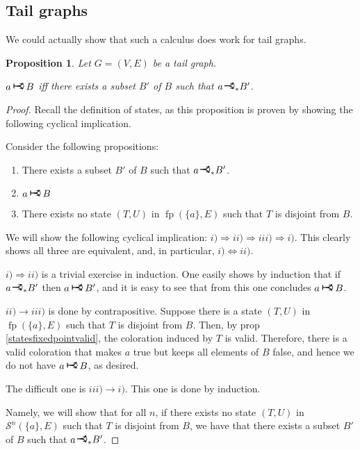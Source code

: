 \documentclass[11pt]{article}
\newcommand{\cS}{\mathcal{S}}
\DeclareMathOperator{\fp}{fp}
\newcommand{\rightcurveor}{
\!
\mathrel{
  \begin{tikzpicture}[scale=0.8]
    \draw[thick,->] (0,0) arc (90:150:-2ex);
    \draw[thick,->] (0,0) arc (90:30:2ex);
    \draw[thick] (-1ex, 0) -- (0.1ex,0);
  \end{tikzpicture}
}\!
}
\newcommand{\Rightcurveor}{
\mathrel{
  \begin{tikzpicture}[scale=0.8]
    \draw[thick,->] (0,0) arc (90:150:-2ex);
    \draw[thick,->] (0,0) arc (90:30:2ex);
    \draw[thick] (-1ex, 0) -- (0.1ex,0);
    \draw[thick] (-1ex, -0.7ex) -- (-1ex, 0.7ex);
  \end{tikzpicture}
}
}
\newtheorem{prop}{Proposition}
\begin{document}
\subsection{Tail graphs}

We could actually show that such a calculus does work for tail graphs.

\begin{prop}
Let $G = (V,E)$ be a tail graph.

$a \Rightcurveor B$ iff there exists a subset $B'$ of $B$ such that $a \rightcurveor_* B'$.
\end{prop}

\begin{proof}
Recall the definition of states, as this proposition is proven by showing the following cyclical implication.

Consider the following propositions:

\begin{enumerate}[i]
\item There exists a subset $B'$ of $B$ such that $a \rightcurveor_* B'$.
\item $a \Rightcurveor B$
\item There exists no state $(T,U)$ in $\fp (\{a\}, E)$ such that $T$ is disjoint from $B$.
\end{enumerate}

We will show the following cyclical implication: $i) \Rightarrow ii) \Rightarrow iii) \Rightarrow i)$. This clearly shows all three are equivalent, and, in particular, $i) \Leftrightarrow ii)$.

$i) \Rightarrow ii)$ is a trivial exercise in induction. One easily shows by induction that if $a \rightcurveor_* B'$ then $a \Rightcurveor B'$, and it is easy to see that from this one concludes $a \Rightcurveor B$.

$ii) \rightarrow iii)$ is done by contrapositive. Suppose there is a state $(T, U)$ in $\fp (\{a\}, E)$ such that $T$ is disjoint from $B$. Then, by prop \ref{statesfixedpointvalid}, the coloration induced by $T$ is valid. Therefore, there is a valid coloration that makes $a$ true but keeps all elements of $B$ false, and hence we do not have $a \Rightcurveor B$, as desired.

The difficult one is $iii) \rightarrow i)$. This one is done by induction.

Namely, we will show that for all $n$, if there exists no state $(T,U)$ in $\cS^n (\{a\}, E)$ such that $T$ is disjoint from $B$, we have that there exists a subset $B'$ of $B$ such that $a \rightcurveor_* B'$.


\end{proof}
\end{document}
